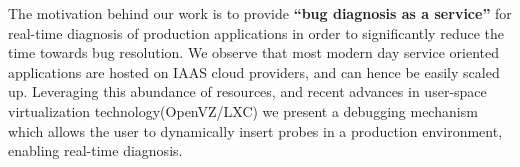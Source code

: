 

The motivation behind our work is to provide \textbf{``bug diagnosis as a service''} for real-time diagnosis of production applications in order to significantly reduce the time towards bug resolution.
We observe that most modern day service oriented applications are hosted on IAAS cloud providers, and can hence be easily scaled  up. 
Leveraging this abundance of resources, and recent advances in user-space virtualization technology(OpenVZ/LXC\cite{openvz,linux}) we present a debugging mechanism which allows the user to dynamically insert probes in a production environment, enabling real-time diagnosis.

